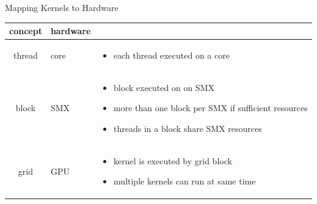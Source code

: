 \documentclass[aspectratio=43]{beamer}
\begin{document}
\begin{frame}[fragile]{Mapping Kernels to Hardware}
\begin{center}
\vspace{-0.75cm}
\begin{tabular}{|c|m{5cm}|m{4cm}|}
    \cline{1-2}
        concept & hardware &  \multicolumn{1}{c}{} \\
    \hline
        thread &
        core &
        \footnotesize
        \begin{itemize}
            \item each thread executed on a core
        \end{itemize} \\
    \hline
        block & SMX &
        \footnotesize
        \begin{itemize}
            \item block executed on on SMX
            \item more than one block per SMX if sufficient resources
            \item threads in a block share SMX resources
        \end{itemize} \\
    \hline
        grid & GPU &
        \footnotesize
        \begin{itemize}
            \item kernel is executed by grid block
            \item multiple kernels can run at same time
        \end{itemize} \\
\hline
\end{tabular}
\end{center}
\end{frame}
\end{document}
